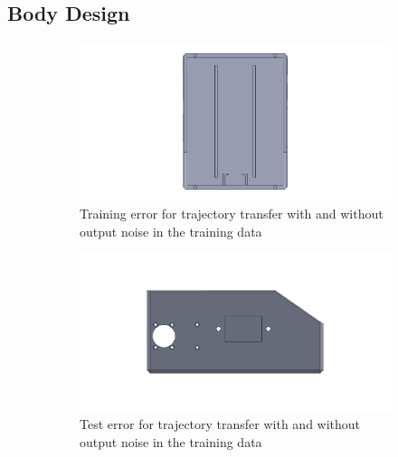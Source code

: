 \subsection{Body Design}
\begin{figure}[h!]
    \centering
    \begin{subfigure}[t]{0.495\textwidth}
        \centering\captionsetup{width=.87\linewidth}
        \includegraphics[width=\textwidth]{Body_Design_1}
        \caption{Training error for trajectory transfer with and without output noise in the training data}
        \label{subfig:sim1_lsd_results_training}
    \end{subfigure}
    \hfill
    \begin{subfigure}[t]{0.495\textwidth}
        \centering\captionsetup{width=.87\linewidth}
        \includegraphics[width=\textwidth]{Body_Design_2}
        \caption{Test error for trajectory transfer with and without output noise in the training data}
		\label{subfig:sim1_lsd_results_test}
    \end{subfigure}
    \par\bigskip
    \begin{subfigure}[t]{1\textwidth}
        \centering\captionsetup{width=.87\linewidth}

\end{subfigure}
\end{figure}
